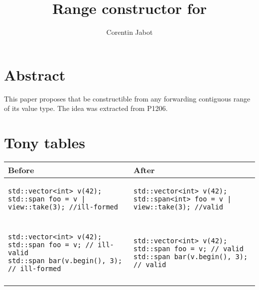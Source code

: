 \documentclass{wg21}
\title{Range constructor for \tcode{std::span}}
\author{Corentin Jabot}{corentin.jabot@gmail.com}
\begin{document}
\maketitle

\section{Abstract}

This paper proposes that  be constructible from any forwarding contiguous range of its value type.
The idea was extracted from P1206. 

\section{Tony tables}
\begin{center}
\begin{tabular}{l|l}
Before & After\\ \hline

\begin{minipage}[t]{0.5\textwidth}
\begin{verbatim}
std::vector<int> v(42);
std::span foo = v | view::take(3); //ill-formed
\end{verbatim}
\end{minipage}
&
\begin{minipage}[t]{0.5\textwidth}
\begin{verbatim}
std::vector<int> v(42);
std::span<int> foo = v | view::take(3); //valid
\end{verbatim}
\end{minipage}
\\\\ \hline


\begin{minipage}[t]{0.5\textwidth}
\begin{verbatim}
std::vector<int> v(42);
std::span foo = v; // ill-valid
std::span bar(v.begin(), 3); // ill-formed
\end{verbatim}
\end{minipage}
&
\begin{minipage}[t]{0.5\textwidth}
\begin{verbatim}
std::vector<int> v(42);
std::span foo = v; // valid
std::span bar(v.begin(), 3); // valid

\end{verbatim}
\end{minipage}
\\\\ \hline


\end{tabular}
\end{center}
\end{document}
